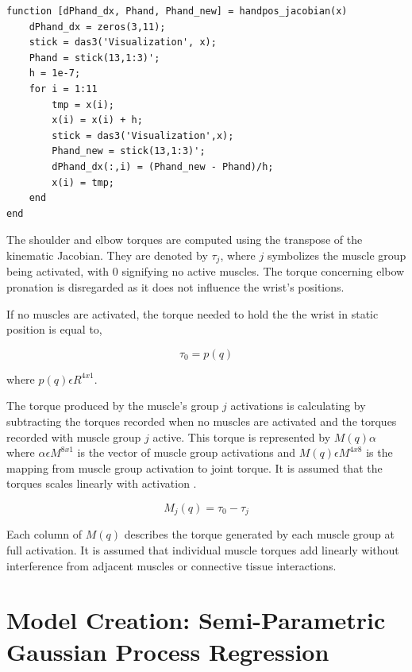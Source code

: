 \begin{lstlisting}[style=Matlab-editor]
function [dPhand_dx, Phand, Phand_new] = handpos_jacobian(x)
    dPhand_dx = zeros(3,11);
    stick = das3('Visualization', x);
    Phand = stick(13,1:3)';
    h = 1e-7;
    for i = 1:11
        tmp = x(i);
        x(i) = x(i) + h;
        stick = das3('Visualization',x);
        Phand_new = stick(13,1:3)';
        dPhand_dx(:,i) = (Phand_new - Phand)/h;
        x(i) = tmp;
    end        
end
\end{lstlisting}

The shoulder and elbow torques are computed using the transpose of the kinematic Jacobian. They are denoted by $\tau_{j}$, where $j$ symbolizes the muscle group being activated, with 0 signifying no active muscles. The torque concerning elbow pronation is disregarded as it does not influence the wrist's positions. 

If no muscles are activated, the torque needed to hold the the wrist in static position is equal to,

\begin{equation}
\tau_0 = p(q)
\end{equation}

where $p(q) \epsilon  R^{4x1}$. 

The torque produced by the muscle's group $j$ activations is calculating by subtracting the torques recorded when no muscles are activated and the torques recorded with muscle group $j$ active. This torque  is represented by $M(q)\alpha$ where $\alpha \epsilon M^{8x1}$ is the vector of muscle group activations and $M(q) \epsilon M^{4x8}$ is the mapping from muscle group activation to joint torque. It is assumed that the torques scales linearly with activation \cite{SPI}. 

\begin{equation} \label{eq:MAP}
    M_j(q) = \tau_0 - \tau_j
\end{equation}

Each column of $M(q)$ describes the torque generated by each muscle group at full activation. It is assumed that individual muscle torques add linearly without interference from adjacent muscles or connective tissue interactions. 




\newpage
\section{Model Creation: Semi-Parametric Gaussian Process Regression} \label{sec:spgp}

